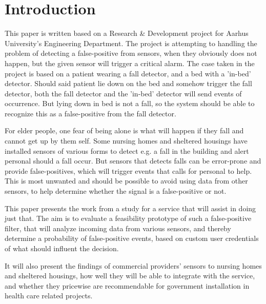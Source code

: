 \section{Introduction}

This paper is written based on a Research \& Development project for Aarhus University's Engineering Department.
The project is attempting to handling the problem of detecting a false-positive from sensors, when they obviously does not happen, but the given sensor will trigger a critical alarm.
The case taken in the project is based on a patient wearing a fall detector, and a bed with a 'in-bed' detector.
Should said patient lie down on the bed and somehow trigger the fall detector, both the fall detector and the 'in-bed' detector will send events of occurrence. 
But lying down in bed is not a fall, so the system should be able to recognize this as a false-positive from the fall detector.

For elder people, one fear of being alone is what will happen if they fall and cannot get up by them self\cite{bell2000characteristics}.
Some nursing homes and sheltered housings have installed sensors of various forms\cite{Tun-Loft} to detect e.g. a fall in the building and alert personal should a fall occur. 
But sensors that detects falls can be error-prone\cite{bardram2008context} and provide false-positives, which will trigger events that calls for personal to help.
This is most unwanted and should be possible to avoid using data from other sensors, to help determine whether the signal is a false-positive or not.

This paper presents the work from a study for a service that will assist in doing just that.
The aim is to evaluate a feasibility prototype of such a false-positive filter, that will analyze incoming data from various sensors, and thereby determine a probability of false-positive events, based on custom user credentials of what should influent the decision.

It will also present the findings of commercial providers' sensors to nursing homes and sheltered housings, how well they will be able to integrate with the service, and whether they pricewise are recommendable for government installation in health care related projects.
